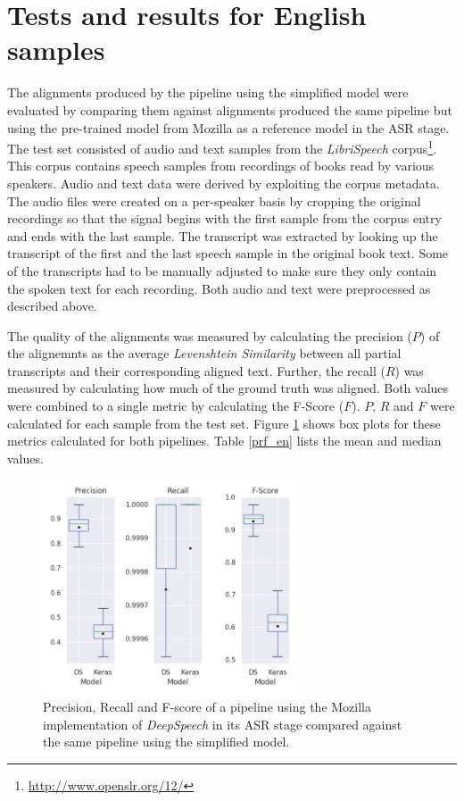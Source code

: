 \documentclass[letterpaper]{article}
\begin{document}
\section{Tests and results for English samples}

The alignments produced by the pipeline using the simplified model were evaluated by comparing them against alignments produced the same pipeline but using the pre-trained model from Mozilla as a reference model in the ASR stage. The test set consisted of audio and text samples from the \textit{LibriSpeech} corpus\footnote{\url{http://www.openslr.org/12/}}. This corpus contains speech samples from recordings of books read by various speakers. Audio and text data were derived by exploiting the corpus metadata. The audio files were created on a per-speaker basis by cropping the original recordings so that the signal begins with the first sample from the corpus entry and ends with the last sample. The transcript was extracted by looking up the transcript of the first and the last speech sample in the original book text. Some of the transcripts had to be manually adjusted to make sure they only contain the spoken text for each recording. Both audio and text were preprocessed as described above.

The quality of the alignments was measured by calculating the precision ($P$) of the alignemnts as the average \textit{Levenshtein Similarity} between all partial transcripts and their corresponding aligned text. Further, the recall ($R$) was measured by calculating how much of the ground truth was aligned. Both values were combined to a single metric by calculating the F-Score ($F$). $P$, $R$ and $F$ were calculated for each sample from the test set. Figure \ref{boxplot_en} shows box plots for these metrics calculated for both pipelines. Table \ref{prf_en} lists the mean and median values.

\begin{figure}[!htb]
	\begin{center}
		\includegraphics[width=3in]{boxplot_en.png}
		\caption{Precision, Recall and F-score of a pipeline using the Mozilla implementation of \textit{DeepSpeech} in its ASR stage compared against the same pipeline using the simplified model.}
		\label{boxplot_en}
	\end{center}
\end{figure}
\end{document}
